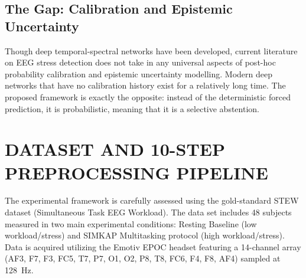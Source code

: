 \documentclass[conference,a4paper]{IEEEtran}
\begin{document}
\subsection{The Gap: Calibration and Epistemic Uncertainty}
Though deep temporal-spectral networks have been developed, current literature on EEG stress detection does not take in any universal aspects of post-hoc probability calibration and epistemic uncertainty modelling. Modern deep networks that have no calibration history exist for a relatively long time. The proposed framework is exactly the opposite: instead of the deterministic forced prediction, it is probabilistic, meaning that it is a selective abstention.
\begin{table}[htbp]
\renewcommand{\arraystretch}{1.4}
\caption{Systematic Literature Survey and Comparative Positioning}
\label{tab:lit_survey}
\begin{center}
\end{center}
\end{table}

\section{DATASET AND 10-STEP PREPROCESSING PIPELINE}
The experimental framework is carefully assessed using the gold-standard STEW dataset (Simultaneous Task EEG Workload). The data set includes 48 subjects measured in two main experimental conditions: Resting Baseline (low workload/stress) and SIMKAP Multitasking protocol (high workload/stress). Data is acquired utilizing the Emotiv EPOC headset featuring a 14-channel array (AF3, F7, F3, FC5, T7, P7, O1, O2, P8, T8, FC6, F4, F8, AF4) sampled at 128~Hz.
\end{document}
